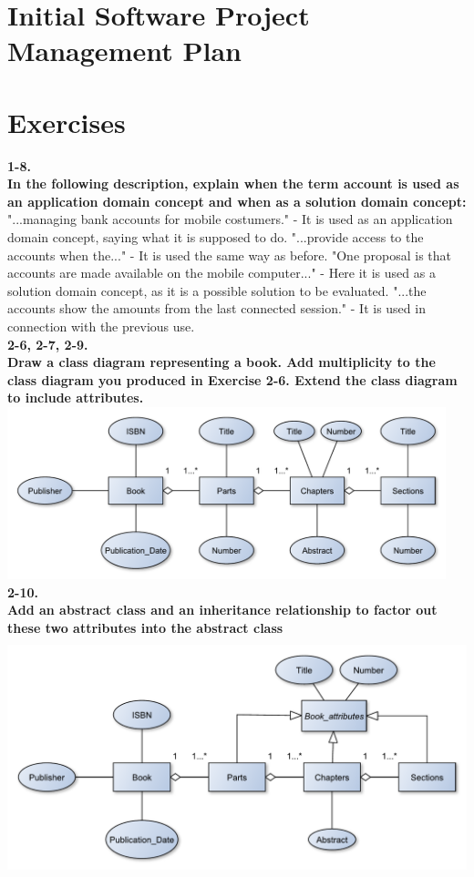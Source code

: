 \documentclass[12pt]{article}
\begin{document}
\newpage
\section{Initial Software Project Management Plan}

\newpage
\section{Exercises}
\textbf{1-8.}\\
\textbf{In the following description, explain when the term account is used as an application domain concept and when as a solution domain concept:}\\
"...managing bank accounts for mobile costumers." - It is used as an application domain concept, saying what it is supposed to do. 
"...provide access to the accounts when the..." - It is used the same way as before. 
"One proposal is that accounts are made available on the mobile computer..." - Here it is used as a solution domain concept, as it is a possible solution to be evaluated. 
"...the accounts show the amounts from the last connected session." - It is used in connection with the previous use.\\

\newpage
\textbf{2-6, 2-7, 2-9.}\\
\textbf{Draw a class diagram representing a book. Add multiplicity to the class diagram you produced in Exercise 2-6. Extend the class diagram to include attributes.}\\

\includegraphics[height=50mm]{2-6}\\

\textbf{2-10.}\\
\textbf{Add an abstract class and an inheritance relationship to factor out these two attributes into the abstract class}\\

\includegraphics[height=70mm]{2-10}
\end{document}
